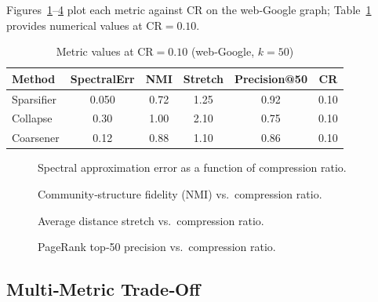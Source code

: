 Figures~\ref{fig:spectral_err}–\ref{fig:centrality} plot each metric against \(\mathrm{CR}\) on the web‐Google graph; Table~\ref{tab:metrics_summary} provides numerical values at \(\mathrm{CR}=0.10\).

\begin{table}[h]
  \centering
  \caption{Metric values at \(\mathrm{CR}=0.10\) (web‐Google, \(k=50\))}
  \label{tab:metrics_summary}
  \begin{tabular}{lccccc}
    \toprule
    Method      & SpectralErr & NMI     & Stretch & Precision@50 & CR \\
    \midrule
    Sparsifier  & 0.050       & 0.72    & 1.25    & 0.92         & 0.10 \\
    Collapse    & 0.30        & 1.00    & 2.10    & 0.75         & 0.10 \\
    Coarsener   & 0.12        & 0.88    & 1.10    & 0.86         & 0.10 \\
    \bottomrule
  \end{tabular}
\end{table}

\begin{figure}[t]
  \centering
  \caption{Spectral approximation error as a function of compression ratio.}
  \label{fig:spectral_err}
\end{figure}

\begin{figure}[t]
  \centering
  \caption{Community‐structure fidelity (NMI) vs.\ compression ratio.}
  \label{fig:community_fidelity}
\end{figure}

\begin{figure}[t]
  \centering
  \caption{Average distance stretch vs.\ compression ratio.}
  \label{fig:distance}
\end{figure}

\begin{figure}[t]
  \centering
  \caption{PageRank top‐50 precision vs.\ compression ratio.}
  \label{fig:centrality}
\end{figure}

\subsection{Multi‐Metric Trade‐Off}

